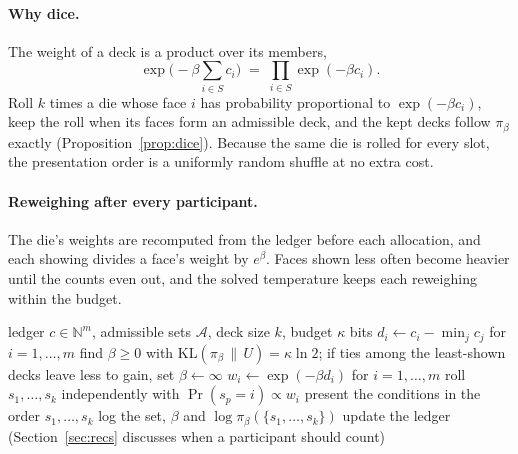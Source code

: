 \documentclass[11pt]{article}
\newcommand{\A}{\mathcal{A}}
\newcommand{\KL}{\mathrm{KL}}
\newcommand{\Unif}{U}
\begin{document}
\paragraph{Why dice.} The weight of a deck is a product over its members,
\[
\exp\Big(-\beta\sum_{i\in S}c_i\Big) \;=\; \prod_{i\in S}\exp(-\beta c_i).
\]
Roll $k$ times a die whose face $i$ has probability proportional to $\exp(-\beta c_i)$, keep the roll when its faces form an admissible deck, and the kept decks follow $\pi_\beta$ exactly (Proposition~\ref{prop:dice}). Because the same die is rolled for every slot, the presentation order is a uniformly random shuffle at no extra cost.

\paragraph{Reweighing after every participant.} The die's weights are recomputed from the ledger before each allocation, and each showing divides a face's weight by $e^{\beta}$. Faces shown less often become heavier until the counts even out, and the solved temperature keeps each reweighing within the budget.

\begin{algorithm}[t]
\caption{Online stochastic trial minimisation, one allocation}\label{alg:ostm}
\begin{algorithmic}[1]
\Require ledger $c\in\mathbb{N}^m$, admissible sets $\A$, deck size $k$, budget $\kappa$ bits
\State $d_i \gets c_i - \min_j c_j$ for $i = 1,\dots,m$
\State find $\beta \ge 0$ with $\KL(\pi_\beta \,\|\, \Unif) = \kappa\ln 2$; if ties among the least-shown decks leave less to gain, set $\beta \gets \infty$
\State $w_i \gets \exp(-\beta d_i)$ for $i = 1,\dots,m$ 
\Repeat
  \State roll $s_1,\dots,s_k$ independently with $\Pr(s_p = i) \propto w_i$
\State present the conditions in the order $s_1,\dots,s_k$
\State log the set, $\beta$ and $\log \pi_\beta(\{s_1,\dots,s_k\})$
\State update the ledger (Section~\ref{sec:recs} discusses when a participant should count)
\end{algorithmic}
\end{algorithm}
\end{document}
